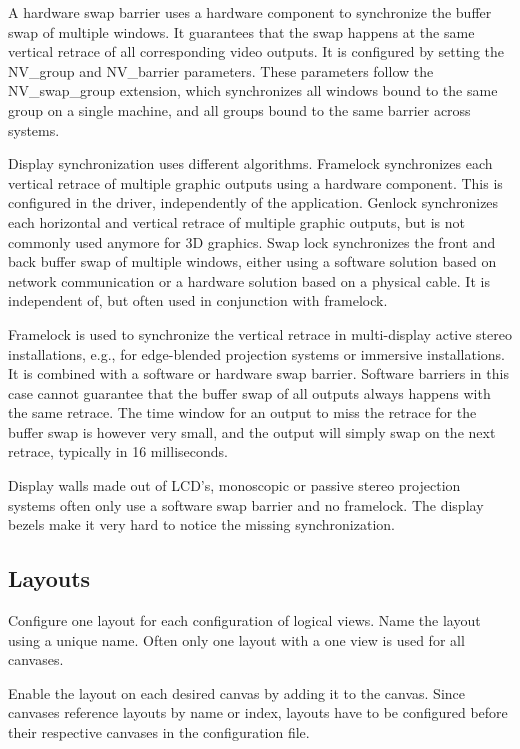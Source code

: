 \documentclass[10pt,a4]{scrartcl}
\begin{document}
A hardware swap barrier uses a hardware component to synchronize the buffer swap
of multiple windows. It guarantees that the swap happens at the same vertical
retrace of all corresponding video outputs.  It is configured by setting the
\textsf{NV\_group} and \textsf{NV\_barrier} parameters. These parameters follow
the \textsf{NV\_swap\_group} extension, which synchronizes all windows bound to
the same group on a single machine, and all groups bound to the same barrier
across systems.

Display synchronization uses different algorithms. Framelock synchronizes each
vertical retrace of multiple graphic outputs using a hardware component. This is
configured in the driver, independently of the application. Genlock synchronizes
each horizontal and vertical retrace of multiple graphic outputs, but is not
commonly used anymore for 3D graphics. Swap lock synchronizes the front and back
buffer swap of multiple windows, either using a software solution based on
network communication or a hardware solution based on a physical cable. It is
independent of, but often used in conjunction with framelock.

Framelock is used to synchronize the vertical retrace in multi-display active
stereo installations, e.g., for edge-blended projection systems or immersive
installations. It is combined with a software or hardware swap barrier. Software
barriers in this case cannot guarantee that the buffer swap of all outputs
always happens with the same retrace. The time window for an output to miss the
retrace for the buffer swap is however very small, and the output will simply
swap on the next retrace, typically in 16 milliseconds.

Display walls made out of LCD's, monoscopic or passive stereo projection systems
often only use a software swap barrier and no framelock. The display bezels make
it very hard to notice the missing synchronization.

\subsection{\label{sLayout}Layouts}

Configure one \textsf{layout} for each configuration of logical
views. Name the layout using a unique name. Often only one layout with a
one view is used for all canvases.

Enable the layout on each desired canvas by adding it to the
canvas. Since canvases reference layouts by name or index, layouts have
to be configured before their respective canvases in the configuration
file.
\end{document}
